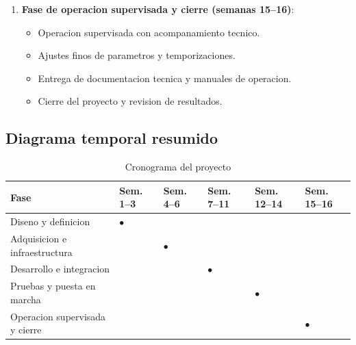 \begin{enumerate}
\begin{itemize}
    \end{itemize}
    \item \textbf{Fase de operacion supervisada y cierre (semanas 15--16)}:
    \begin{itemize}
        \item Operacion supervisada con acompanamiento tecnico.
        \item Ajustes finos de parametros y temporizaciones.
        \item Entrega de documentacion tecnica y manuales de operacion.
        \item Cierre del proyecto y revision de resultados.
    \end{itemize}
\end{enumerate}

\subsection{Diagrama temporal resumido}

\begin{table}[H]
\centering
\small
\caption{Cronograma del proyecto}
\label{tab:cronograma}
\begin{tabularx}{\textwidth}{@{}lXXXXX@{}}
\toprule
\textbf{Fase} & \textbf{Sem. 1--3} & \textbf{Sem. 4--6} & \textbf{Sem. 7--11} & \textbf{Sem. 12--14} & \textbf{Sem. 15--16} \\
\midrule
Diseno y definicion & $\bullet$ & & & & \\
Adquisicion e infraestructura & & $\bullet$ & & & \\
Desarrollo e integracion & & & $\bullet$ & & \\
Pruebas y puesta en marcha & & & & $\bullet$ & \\
Operacion supervisada y cierre & & & & & $\bullet$ \\
\bottomrule
\end{tabularx}
\end{table}



